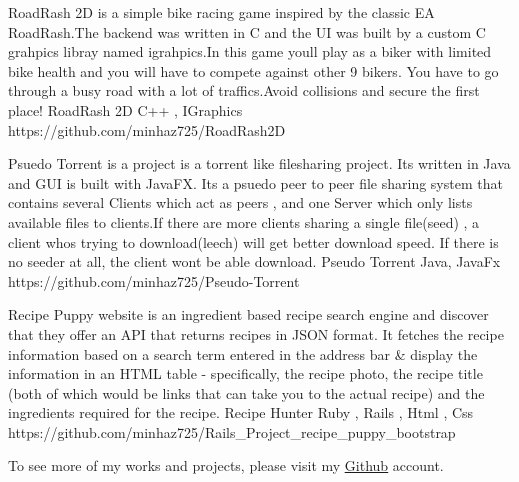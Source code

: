 \documentclass[]{awesome-cv}
\begin{document}
\vspace{-7mm}
\begin{cventries}
	\cventry
	{RoadRash 2D is a simple bike racing game inspired by the classic EA RoadRash.The backend was written in C and the UI was built by a custom C grahpics libray named igrahpics.In this game you\textquotesingle{}ll play as a biker with limited bike health and you will have to compete against other 9 bikers. You have to go through a busy road with a lot of traffics.Avoid collisions and secure the first place!}
	{RoadRash 2D}
	{C++ , IGraphics}
	{https://github.com/minhaz725/RoadRash2D}
	{}
	
	\vspace{-5mm}
	\cventry
	{Psuedo Torrent is a project is a torrent like filesharing project. It\textquotesingle{}s written in Java and GUI is built with JavaFX. It\textquotesingle{}s a psuedo peer to peer file sharing system that contains several \textquotedbl{}Clients\textquotedbl{} which act as peers , and one Server which only lists available files to clients.If there are more clients sharing a single file(seed) , a client who\textquotesingle{}s trying to download(leech) will get better download speed. If there is no seeder at all, the client won\textquotesingle{}t be able download.}
	{Pseudo Torrent}
	{Java, JavaFx}
	{https://github.com/minhaz725/Pseudo-Torrent}
	{}
	
	\vspace{-5mm}
	\cventry
	{Recipe Puppy website is an ingredient based recipe search engine and discover that they offer an API that returns recipes in JSON format. It fetches the recipe information based on a search term entered in the address bar \& display the information in an HTML table - specifically, the recipe photo, the recipe title (both of which would be links that can take you to the actual recipe) and the ingredients required for the recipe.}
	{Recipe Hunter}
	{Ruby , Rails , Html , Css}
	{https://github.com/minhaz725/Rails\_Project\_recipe\_puppy\_bootstrap}
	{}
	
	\vspace{-5mm}
	\cventry
	{}
	{To see more of my works and projects, please visit my \href{https://github.com/minhaz725}{\underline{Github}} account. }
	{}
	{}
	{}
	
	\vspace{-5mm}
\end{cventries}

\ 
\end{document}
